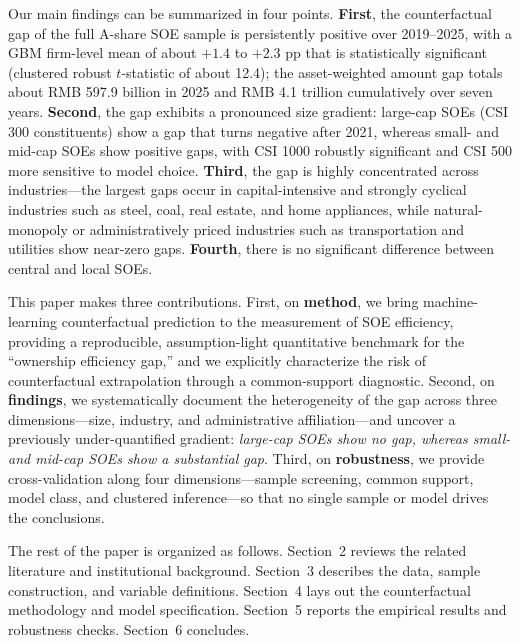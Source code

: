\documentclass[11pt,a4paper]{article}
\begin{document}
Our main findings can be summarized in four points. \textbf{First}, the counterfactual gap of the full A-share SOE sample is persistently positive over 2019--2025, with a GBM firm-level mean of about $+1.4$ to $+2.3$ pp that is statistically significant (clustered robust $t$-statistic of about 12.4); the asset-weighted amount gap totals about RMB 597.9 billion in 2025 and RMB 4.1 trillion cumulatively over seven years. \textbf{Second}, the gap exhibits a pronounced size gradient: large-cap SOEs (CSI 300 constituents) show a gap that turns negative after 2021, whereas small- and mid-cap SOEs show positive gaps, with CSI 1000 robustly significant and CSI 500 more sensitive to model choice. \textbf{Third}, the gap is highly concentrated across industries---the largest gaps occur in capital-intensive and strongly cyclical industries such as steel, coal, real estate, and home appliances, while natural-monopoly or administratively priced industries such as transportation and utilities show near-zero gaps. \textbf{Fourth}, there is no significant difference between central and local SOEs.

This paper makes three contributions. First, on \textbf{method}, we bring machine-learning counterfactual prediction to the measurement of SOE efficiency, providing a reproducible, assumption-light quantitative benchmark for the ``ownership efficiency gap,'' and we explicitly characterize the risk of counterfactual extrapolation through a common-support diagnostic. Second, on \textbf{findings}, we systematically document the heterogeneity of the gap across three dimensions---size, industry, and administrative affiliation---and uncover a previously under-quantified gradient: \emph{large-cap SOEs show no gap, whereas small- and mid-cap SOEs show a substantial gap}. Third, on \textbf{robustness}, we provide cross-validation along four dimensions---sample screening, common support, model class, and clustered inference---so that no single sample or model drives the conclusions.

The rest of the paper is organized as follows. Section~2 reviews the related literature and institutional background. Section~3 describes the data, sample construction, and variable definitions. Section~4 lays out the counterfactual methodology and model specification. Section~5 reports the empirical results and robustness checks. Section~6 concludes.

\end{document}
